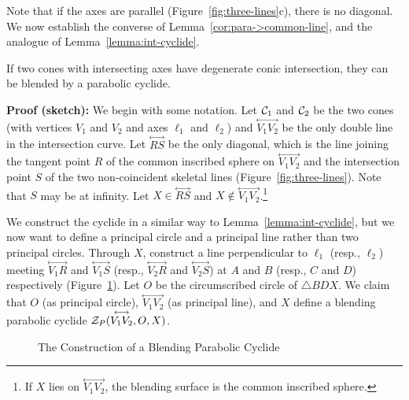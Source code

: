 Note that if the axes are parallel (Figure~\ref{fig:three-lines}c),
there is no diagonal.  
We now establish the converse of Lemma~\ref{cor:para->common-line},
and the analogue of Lemma~\ref{lemma:int-cyclide}.

\begin{lemma}
\label{lemma:three-line-cyclide}
If two cones with intersecting axes have degenerate conic
intersection, they can be blended by a parabolic cyclide.
\end{lemma}
{\bf Proof (sketch):} 
We begin with some notation.
Let ${\cal C}_1$ and ${\cal C}_2$ be the two cones 
(with vertices $V_1$ and $V_2$ and axes $\ell_1$ and $\ell_2$) 
and $\stackrel{\longleftrightarrow}{V_1V_2}$ be the only double line in the
intersection curve.  
Let $\stackrel{\longleftrightarrow}{RS}$ be the only diagonal,
which is the 
line joining the tangent point $R$ of the common inscribed sphere on 
$\stackrel{\longleftrightarrow}{V_1V_2}$
and the intersection point $S$ of the two non-coincident skeletal lines
\cite{shene-johnstone:1991b} (Figure~\ref{fig:three-lines}).
Note that $S$ may be at infinity.  
Let $X\in\stackrel{\longleftrightarrow}{RS}$ and 
$X\not\in\stackrel{\longleftrightarrow}{V_1V_2}$.\footnote{If $X$ lies on
$\stackrel{\longleftrightarrow}{V_1V_2}$, the blending surface is the common
inscribed sphere.}

We construct the cyclide in a similar way to Lemma~\ref{lemma:int-cyclide},
but we now want to define a principal circle and a principal line rather
than two principal circles.
Through $X$, construct 
a line perpendicular to $\ell_1$ (resp., $\ell_2$) meeting
$\stackrel{\longleftrightarrow}{V_1R}$ and
$\stackrel{\longleftrightarrow}{V_1S}$ (resp.,
$\stackrel{\longleftrightarrow}{V_2R}$ and
$\stackrel{\longleftrightarrow}{V_2S}$) at $A$ and $B$ (resp., $C$ and $D$)
respectively (Figure~\ref{fig:parabolic-construct}).  
Let $O$ be the circumscribed circle of $\bigtriangleup BDX$.  
We claim that $O$ (as principal circle), 
$\stackrel{\longleftrightarrow}{V_1V_2}$ (as principal line), 
and $X$ define a blending
parabolic cyclide ${\cal Z}_P(\stackrel{\longleftrightarrow}{V_1V_2},O,X)$.

\begin{figure}
\vspace{5.5cm}
\caption{The Construction of a Blending Parabolic Cyclide}
\label{fig:parabolic-construct}
\end{figure}

